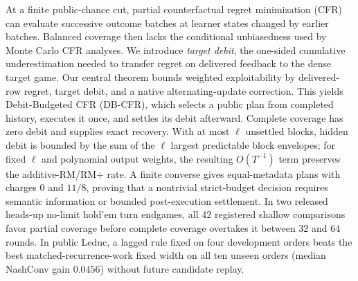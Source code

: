 At a finite public-chance cut, partial counterfactual regret minimization (CFR)
can evaluate successive outcome batches at learner states changed by earlier
batches.  Balanced coverage then lacks the conditional unbiasedness used by
Monte Carlo CFR analyses.  We introduce \emph{target debit}, the one-sided
cumulative underestimation needed to transfer regret on delivered feedback to
the dense target game.  Our central theorem bounds weighted exploitability by
delivered-row regret, target debit, and a native alternating-update correction.
This yields Debit-Budgeted CFR (DB-CFR), which selects a public plan from
completed history, executes it once, and settles its debit afterward.  Complete
coverage has zero debit and supplies exact recovery.  With at most $\ell$
unsettled blocks, hidden debit is bounded by the sum of the $\ell$ largest
predictable block envelopes; for fixed $\ell$ and polynomial output weights,
the resulting $O(T^{-1})$ term preserves the additive-RM/RM+ rate.  A finite
converse gives equal-metadata plans with charges $0$ and $11/8$, proving that a
nontrivial strict-budget decision requires semantic information or bounded
post-execution settlement.  In two released heads-up no-limit hold'em turn
endgames, all 42 registered shallow comparisons favor partial coverage before
complete coverage overtakes it between 32 and 64 rounds.  In public Leduc, a
lagged rule fixed on four development orders beats the best
matched-recurrence-work fixed width on all ten unseen orders (median NashConv
gain $0.0456$) without future candidate replay.

